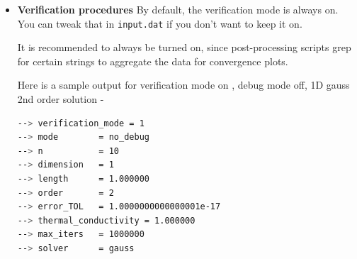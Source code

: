 \documentclass[12 pt, final]{article}
\begin{document}
\begin{itemize}
\begin{lstlisting}[language = bash, basicstyle=\tiny]
[solver]

thermal_conductivity    = 1.0               # Thermal conductivity k_0   
solver_name = jacobi                        # Use either jacobi or gauss
order = 2                                   # Order of accuracy of stencil, use 2 or 4
error_TOL       = 0.00000000000000001       # Tolerance
max_iters       = 1000000                   # Maximum number of iterations
    \end{lstlisting}
    \begin{itemize}
        \item \underline{Modes}
        
        The debug mode can be activated by using \texttt{mode = debug}. Anything else is assumed to mean not in debug mode. It gives out a verbose output, an example can be found below.
        
        There is also a verification mode which is recommended to always be turned on, since post-processing scripts grep for certain strings to aggregate the data for convergence plots. 
        \item \underline{Grid options}
        
        The options are domain length \texttt{length}, dimension \texttt{dimension} (which can be 1D or 2D) and number of grid points in one direction \texttt{grid\_points}. 
        \item \underline{Solver options}
        
        The solver options are essentially specifications of physical parameters such as \texttt{thermal\_conductivity} and other specifications such as error tolerance \texttt{error\_TOL}, order of accuracy desired \texttt{order}, name of the solver \texttt{solver\_name} and maximum iterations allowed \texttt{max\_iters}. \textcolor{red}{DO NOT} change the \texttt{error\_TOL = 1e-17} and \texttt{max\_iters = 1000000} if you want to compare to reference solutions.
    \end{itemize}
    \item \textbf{Verification procedures}
    By default, the verification mode is always on. You can tweak that in \texttt{input.dat} if you don't want to keep it on.
    
    It is recommended to always be turned on, since post-processing scripts grep for certain strings to aggregate the data for convergence plots.
    
    Here is a sample output for verification mode on , debug mode off, 1D gauss 2nd order solution -
    \begin{lstlisting}[language = bash, basicstyle=\tiny]
--> verification_mode = 1
--> mode        = no_debug
--> n           = 10
--> dimension   = 1
--> length      = 1.000000
--> order       = 2
--> error_TOL   = 1.0000000000000001e-17
--> thermal_conductivity = 1.000000
--> max_iters   = 1000000
--> solver      = gauss


\end{lstlisting}
\end{itemize}
\end{document}
